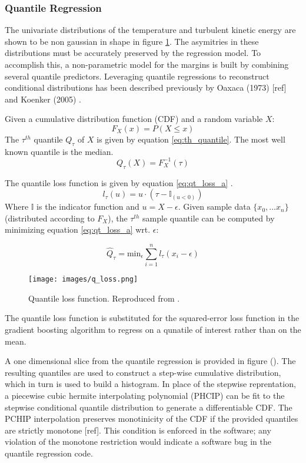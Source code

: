 \subsubsection{Quantile Regression}

The univariate distributions of the temperature and turbulent kinetic energy are shown to be non gaussian in shape in figure \ref{fig:ctf_patch_dist}.  The asymitries in these distributions must be accurately preserved by the regression model.  To accomplish this, a non-parametric model for the margins is built by combining several quantile predictors.  Leveraging quantile regressions to reconstruct conditional distributions has been described previously by Oaxaca (1973) [ref] and Koenker (2005) \cite{koenker05}.

Given a cumulative distribution function (CDF) and a random variable $X$:
\begin{equation}
F_X(x) = P(X \leq x)
\end{equation}
The $\tau^{th}$ quantile $Q_\tau$ of $X$ is given by equation \ref{eq:th_quantile}.  The most well known quantile is the median.
\begin{equation}
Q_\tau(X) = F_X^{-1}(\tau)
\label{eq:th_quantile}
\end{equation}

The quantile loss function is given by equation \ref{eq:qt_loss_a} \cite{koenker05}.
\begin{equation}
l_\tau(u) = u \cdot (\tau - \mathbb{I}_{(u < 0)})
\label{eq:qt_loss_a}
\end{equation}
Where $\mathbb{I}$ is the indicator function and $u=X - \epsilon$.
Given sample data $\{x_0, ... x_n\}$ (distributed according to $F_X$), the $\tau^{th}$ sample quantile can be computed by minimizing equation \ref{eq:qt_loss_a} wrt. $\epsilon$:

\begin{equation}
\hat Q_\tau = \mathrm{min}_\epsilon \sum_{i=1}^n l_\tau (x_i - \epsilon)
\end{equation}

\begin{figure}[!htbp]
\centering
\texttt{[image: images/q\_loss.png]}
\caption{Quantile loss function.  Reproduced from \cite{koenker05}.}
\label{fig:ctf_patch_dist}
\end{figure}

The quantile loss function is substituted for the squared-error loss function in the gradient boosting algorithm to regress on a qunatile of interest rather than on the mean.  

A one dimensional slice from the quantile regression is provided in figure ().
The resulting quantiles are used to construct a step-wise cumulative distribution, which in turn is used to build a histogram. 
In place of the stepwise reprentation, a piecewise cubic hermite interpolating polynomial (PHCIP) can be fit to the stepwise conditional quantile distribution to generate a differentiable CDF.
The PCHIP interpolation preserves monotinicity of the CDF if the provided quantiles are strictly monotone [ref].  This condition is enforced in the software; any violation of the monotone restriction would indicate a software bug in the quantile regression code.
